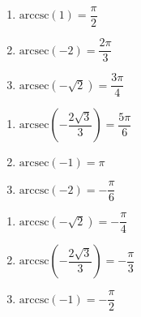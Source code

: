 \documentclass{ximera}
\begin{document}
\begin{multicols}{3} 

\begin{enumerate}

\setcounter{enumi}{\value{HW}}

\item $\mbox{arccsc} \left( 1 \right) = \dfrac{\pi}{2}$ 
\item $\mbox{arcsec} \left( -2 \right) = \dfrac{2\pi}{3}$ 
\item $\mbox{arcsec} \left( -\sqrt{2} \right) = \dfrac{3\pi}{4}$ 


\setcounter{HW}{\value{enumi}}

\end{enumerate}

\end{multicols}

\begin{multicols}{3} 

\begin{enumerate}

\setcounter{enumi}{\value{HW}}


\item $\mbox{arcsec} \left( -\dfrac{2\sqrt{3}}{3} \right) = \dfrac{5\pi}{6}$
\item $\mbox{arcsec} \left( -1 \right) = \pi$ 
\item $\mbox{arccsc} \left( -2 \right) = -\dfrac{\pi}{6}$ 

\setcounter{HW}{\value{enumi}}

\end{enumerate}

\end{multicols}

\begin{multicols}{3} 

\begin{enumerate}

\setcounter{enumi}{\value{HW}}


\item $\mbox{arccsc} \left( -\sqrt{2} \right) = -\dfrac{\pi}{4}$ 
\item $\mbox{arccsc} \left( -\dfrac{2\sqrt{3}}{3} \right) = -\dfrac{\pi}{3}$
\item $\mbox{arccsc} \left( -1 \right) = -\dfrac{\pi}{2}$ 

\setcounter{HW}{\value{enumi}}

\end{enumerate}

\end{multicols}
\end{document}
